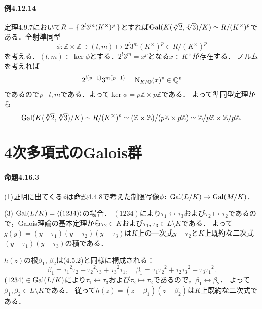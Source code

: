 \documentclass[a4paper]{ltjsreport}
\begin{document}
\paragraph{例4.12.14}
定理4.9.7において\(R = \set{2^l3^m (K^\times)^p}\)とすれば\(\operatorname{Gal}(K(\sqrt[p]{2}, \sqrt[p]{3})/K) \simeq R/(K^\times)^p\)である．全射準同型
\[ \phi \colon \mathbb{Z} \times \mathbb{Z} \ni (l, m) \mapsto 2^l3^m (K^\times)^p \in R/(K^\times)^p \]
を考える．\((l,m) \in \ker\phi\)とする．\(2^l3^m = x^p\)となる\(x\in K^\times\)が存在する．
ノルムを考えれば
\[ 2^{l(p-1)}3^{m(p-1)} = \operatorname{N}_{K/\mathbb{Q}}(x)^p \in \mathbb{Q}^p \]
であるので\(p \mid l, m\)である．よって\(\ker\phi = p\mathbb{Z} \times p\mathbb{Z}\)である．
よって準同型定理から
\[ \operatorname{Gal}(K(\sqrt[p]{2}, \sqrt[p]{3})/K) \simeq R/(K^\times)^p \simeq (\mathbb{Z} \times \mathbb{Z}) / (p\mathbb{Z} \times p\mathbb{Z}) \simeq \mathbb{Z}/p\mathbb{Z} \times \mathbb{Z}/p\mathbb{Z} . \]

\setcounter{section}{15}
\section{4次多項式のGalois群}
\paragraph{命題4.16.3}
(1)証明に出てくる\(\phi\)は命題4.4.8で考えた制限写像\(\phi\colon\operatorname{Gal}(L/K)\to\operatorname{Gal}(M/K)\)．

(3) \(\operatorname{Gal}(L/K)=\braket{(1234)}\)の場合．
\((1234)\)により\(\tau_1\leftrightarrow\tau_3\)および\(\tau_2\mapsto\tau_2\)であるので，Galois理論の基本定理から\(\tau_2 \in K\)および\(\tau_1, \tau_3 \in L\setminus K\)である．
よって\(g(y)=(y-\tau_1)(y-\tau_2)(y-\tau_3)\)は\(K\)上の一次式\(y-\tau_2\)と\(K\)上既約な二次式\((y-\tau_1)(y-\tau_3)\)の積である．

\(h(z)\)の根\(\beta_1\), \(\beta_2\)は(4.5.2)と同様に構成される：
\[
\beta_1 = \tau_1{}^2 \tau_2 + \tau_2{}^2 \tau_3 + \tau_3{}^2 \tau_1 , \quad
\beta_1 = \tau_1 \tau_2{}^2 + \tau_2 \tau_3{}^2 + \tau_3 \tau_1{}^2 .
\]
\((1234) \in\operatorname{Gal}(L/K)\)により\(\tau_1\leftrightarrow\tau_3\)および\(\tau_2\mapsto\tau_2\)であるので，\(\beta_1 \leftrightarrow \beta_2\)．
よって\(\beta_1, \beta_2 \in L\setminus K\)である．
従って\(h(z)=(z-\beta_1)(z-\beta_2)\)は\(K\)上既約な二次式である．
\end{document}
